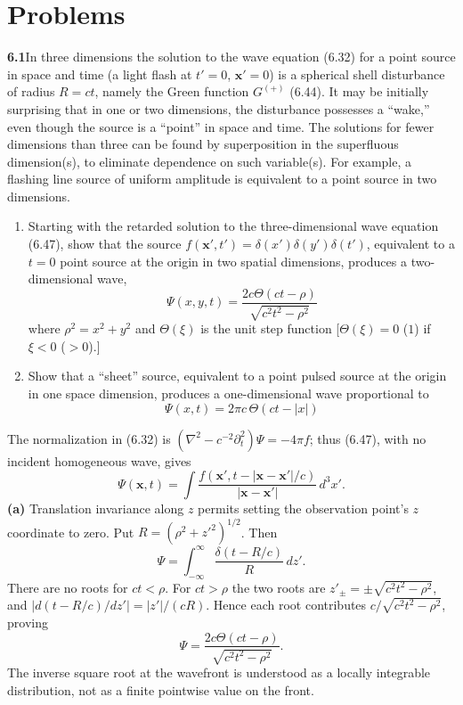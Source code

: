 
\section*{Problems}

\par\bigskip
\noindent\textbf{6.1}\quad In three dimensions the solution to the wave equation (6.32) for a point source in space and time (a light flash at $t'=0$, $\mathbf{x}'=0$) is a spherical shell disturbance of radius $R=ct$, namely the Green function $G^{(+)}$ (6.44). It may be initially surprising that in one or two dimensions, the disturbance possesses a ``wake,'' even though the source is a ``point'' in space and time. The solutions for fewer dimensions than three can be found by superposition in the superfluous dimension(s), to eliminate dependence on such variable(s). For example, a flashing line source of uniform amplitude is equivalent to a point source in two dimensions.
\begin{enumerate}
\item[(a)] Starting with the retarded solution to the three-dimensional wave equation (6.47), show that the source $f(\mathbf{x}',t')=\delta(x')\delta(y')\delta(t')$, equivalent to a $t=0$ point source at the origin in two spatial dimensions, produces a two-dimensional wave,
\[
\Psi(x,y,t)=\frac{2c\Theta(ct-\rho)}{\sqrt{c^{2}t^{2}-\rho^{2}}}
\]
where $\rho^{2}=x^{2}+y^{2}$ and $\Theta(\xi)$ is the unit step function [$\Theta(\xi)=0$ ($1$) if $\xi<0$ ($>0$).]
\item[(b)] Show that a ``sheet'' source, equivalent to a point pulsed source at the origin in one space dimension, produces a one-dimensional wave proportional to
\[
\Psi(x,t)=2\pi c\,\Theta(ct-|x|)
\]
\end{enumerate}
\solution

The normalization in (6.32) is $(\nabla^2-c^{-2}\partial_t^2)\Psi=-4\pi f$;
thus (6.47), with no incident homogeneous wave, gives
\[
\Psi(\mathbf x,t)=\int\frac{f(\mathbf x',t-|\mathbf x-\mathbf x'|/c)}
{|\mathbf x-\mathbf x'|}\,d^3x'.
\]
\textbf{(a)} Translation invariance along $z$ permits setting the observation
point's $z$ coordinate to zero. Put $R=(\rho^2+z'^2)^{1/2}$. Then
\[
\Psi=\int_{-\infty}^{\infty}\frac{\delta(t-R/c)}R\,dz'.
\]
There are no roots for $ct<\rho$. For $ct>\rho$ the two roots are
$z'_\pm=\pm\sqrt{c^2t^2-\rho^2}$, and
$|d(t-R/c)/dz'|=|z'|/(cR)$. Hence each root contributes
$c/\sqrt{c^2t^2-\rho^2}$, proving
\[
\boxed{\Psi=\frac{2c\Theta(ct-\rho)}{\sqrt{c^2t^2-\rho^2}}.}
\]
The inverse square root at the wavefront is understood as a locally
integrable distribution, not as a finite pointwise value on the front.

